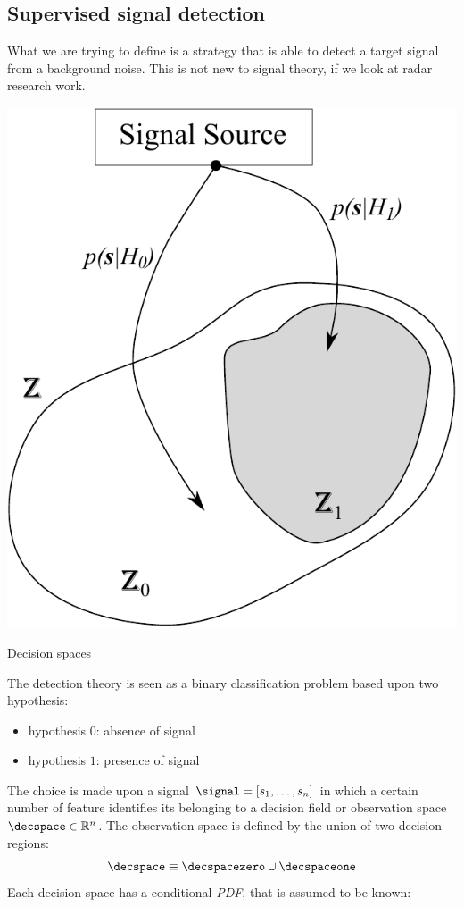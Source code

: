 \subsection{Supervised signal detection}
What we are trying to define is a strategy that is able to detect a target signal from a background noise. This is not new to signal theory, if we look at radar research work.
\begin{marginfigure}
	\centering
	\includegraphics[scale=0.5]{ch3/img/signalsources.pdf}
	\caption{Decision spaces}
\end{marginfigure}
The detection theory is seen as a binary classification problem based upon two hypothesis:
\begin{itemize}
\item hypothesis $0$: absence of signal
\item hypothesis $1$: presence of signal
\end{itemize}
The choice is made upon a signal ${\signal = [s_1,\dots,s_n]}$ in which a certain number of feature identifies its belonging to a decision field or observation space $\decspace \in \mathbb{R}^n$. The observation space is defined by the union of two decision regions:
\[ \decspace \equiv \decspacezero \cup \decspaceone \]
Each decision space has a conditional \emph{PDF}, that is assumed to be known:

